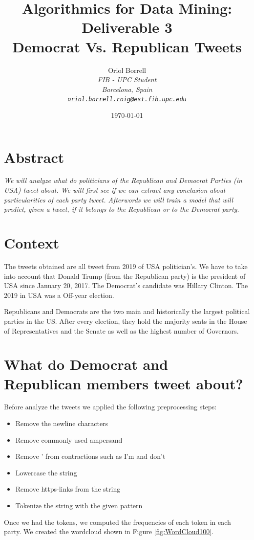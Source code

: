 \documentclass{article}
\title{
\textbf{Algorithmics for Data Mining: Deliverable 3\\} \Large{
    Democrat Vs. Republican Tweets}}
\author{Oriol Borrell\\
\textit{\small FIB - UPC Student} \\
\textit{\small Barcelona, Spain} \\
\textit{\texttt{\href{mailto:oriol.borrell.roig@est.fib.upc.edu}
{\small oriol.borrell.roig@est.fib.upc.edu}}}}
\date{\today}
\begin{document}
\maketitle

\section{Abstract}

\textit{
We will analyze what do politicians of the Republican and Democrat Parties (in USA) tweet about. We will first see if we can extract any conclusion about particularities of each party tweet. Afterwords we will train a model that will predict, given a tweet, if it belongs to the Republican or to the Democrat party.
}

\section{Context}
\label{Context}
The tweets obtained are all tweet from 2019 of USA politician's. We have to take into account that Donald Trump (from the Republican party) is the president of USA since January 20, 2017. The Democrat's candidate was Hillary Clinton. The 2019 in USA was a Off-year election.

Republicans and Democrats are the two main and historically the largest political parties in the US. After every election, they hold the majority seats in the House of Representatives and the Senate as well as the highest number of Governors.

\section{What do Democrat and Republican members tweet about?}

Before analyze the tweets we applied the following preprocessing steps:
\begin{itemize}
    \item Remove the newline characters
    \item Remove commonly used ampersand
    \item Remove ' from contractions such as I'm and don't
    \item Lowercase the string
    \item Remove https-links from the string
    \item Tokenize the string with the given pattern
\end{itemize}

Once we had the tokens, we computed the frequencies of each token in each party. We created the wordcloud shown in Figure \ref{fig:WordCloud100}.
\end{document}
